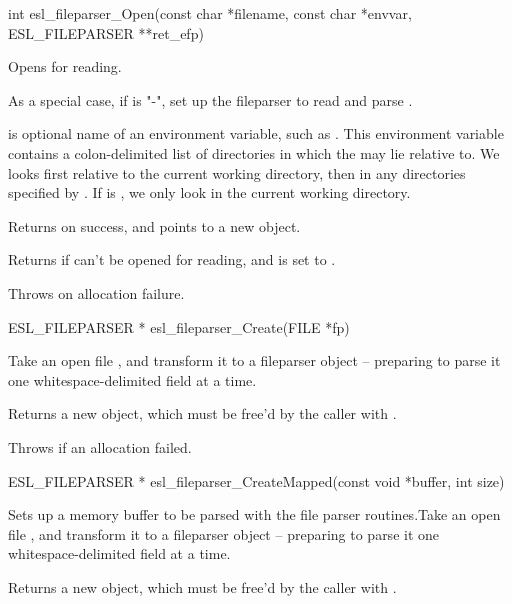 \begin{sreapi}
\hypertarget{func:esl_fileparser_Open()}
{\item[int esl\_fileparser\_Open(const char *filename, const char *envvar, ESL\_FILEPARSER **ret\_efp)]}

Opens  for reading. 

As a special case, if  is "-", set up the
fileparser to read and parse .

 is optional name of an environment variable,
such as . This environment variable contains a
colon-delimited list of directories in which the
 may lie relative to.  We looks first relative
to the current working directory, then in any
directories specified by . If  is ,
we only look in the current working directory.

Returns  on success, and  points
to a new  object.

Returns  if  can't
be opened for reading, and  is set
to .

Throws  on allocation failure.


\hypertarget{func:esl_fileparser_Create()}
{\item[ESL\_FILEPARSER * esl\_fileparser\_Create(FILE *fp)]}

Take an open file , and transform it to
a fileparser object -- preparing to parse it
one whitespace-delimited field at a time.

Returns a new  object, which must be 
free'd by the caller with .

Throws  if an allocation failed.



\hypertarget{func:esl_fileparser_CreateMapped()}
{\item[ESL\_FILEPARSER * esl\_fileparser\_CreateMapped(const void *buffer, int size)]}

Sets up a memory buffer to be parsed with the
file parser routines.Take an open file , and transform it to
a fileparser object -- preparing to parse it
one whitespace-delimited field at a time.

Returns a new  object, which must be 
free'd by the caller with .


\end{sreapi}
